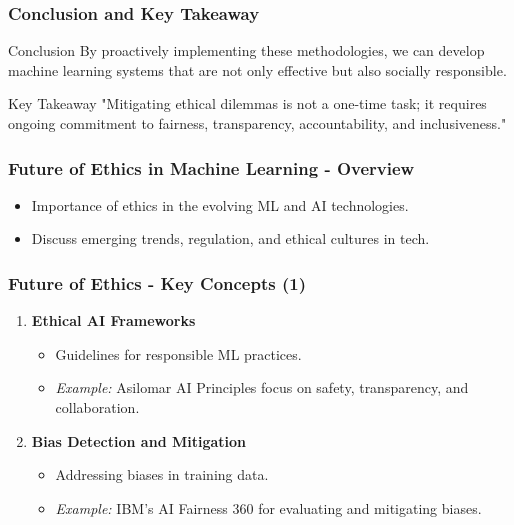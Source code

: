 \documentclass{beamer}
\begin{document}
\begin{frame}[fragile]
    \frametitle{Conclusion and Key Takeaway}
    \begin{block}{Conclusion}
        By proactively implementing these methodologies, we can develop machine learning systems that are not only effective but also socially responsible.
    \end{block}
    
    \begin{block}{Key Takeaway}
        "Mitigating ethical dilemmas is not a one-time task; it requires ongoing commitment to fairness, transparency, accountability, and inclusiveness."
    \end{block}
\end{frame}

\begin{frame}[fragile]
    \frametitle{Future of Ethics in Machine Learning - Overview}
    \begin{itemize}
        \item Importance of ethics in the evolving ML and AI technologies.
        \item Discuss emerging trends, regulation, and ethical cultures in tech.
    \end{itemize}
\end{frame}

\begin{frame}[fragile]
    \frametitle{Future of Ethics - Key Concepts (1)}
    \begin{enumerate}
        \item \textbf{Ethical AI Frameworks}
            \begin{itemize}
                \item Guidelines for responsible ML practices.
                \item \textit{Example:} Asilomar AI Principles focus on safety, transparency, and collaboration.
            \end{itemize}
        
        \item \textbf{Bias Detection and Mitigation}
            \begin{itemize}
                \item Addressing biases in training data.
                \item \textit{Example:} IBM's AI Fairness 360 for evaluating and mitigating biases.
            \end{itemize}
    \end{enumerate}
\end{frame}
\end{document}
